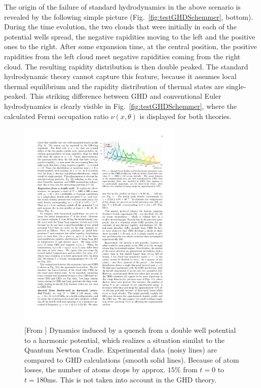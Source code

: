 \documentclass[onecolumn,amsfonts,showpacs,superscriptaddress]{revtex4-1}
\begin{document}
The origin of the failure of standard hydrodynamics in the above scenario is revealed by the following simple picture (Fig.~\ref{fig:testGHDSchemmer}, bottom). %
During the time evolution, the two 
clouds that were initially in each of the potential wells spread,  the negative rapidities moving to the left and the positive ones to the right. 
After some expansion time, at the central position, the positive rapidities from the left cloud meet negative rapidities coming from the right cloud. The resulting rapidity distribution is then double peaked.
 The standard hydrodynamic theory cannot capture this feature, because it assumes local thermal equilibrium and the rapidity distribution of thermal states are single-peaked. 
 This striking difference between GHD and conventional Euler hydrodynamics is clearly visible in Fig.~\ref{fig:testGHDSchemmer}, where the calculated Fermi occupation ratio $\nu(x,\theta)$ is displayed for both theories.
 
 
\begin{figure}[ht]
    \centering
    \includegraphics[width=0.7\textwidth,viewport=309 625 565 750,clip]{figures/GHDSchemmer_NC.pdf}
    \caption{[From \citep{schemmer2019generalized}] Dynamics induced by a quench from a double well potential to a harmonic potential, which realizes a situation similat to the Quantum Newton Cradle. Experimental data (noisy lines) are compared to GHD calculations (smooth solid lines). Because of atom losses, the number of atoms drops by approx. $15\%$ from $t=0$ to $t=180$ms. This is not taken into account in the GHD theory.}
    \label{fig.SchemmerNC}
\end{figure}
\end{document}
